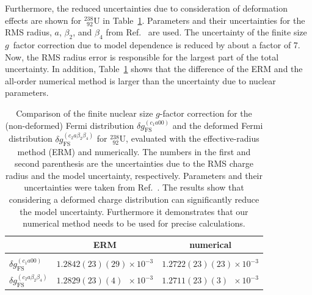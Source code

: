Furthermore, the reduced uncertainties due to consideration of deformation effects are shown for $^{238}_{\;\,92}$U in Table~\ref{tab:uranium}. Parameters and their uncertainties for the RMS radius, $a$, $\beta_2$, and $\beta_4$ from Ref.~\cite{kozhedub2008} are used. The uncertainty of the finite size $g$~factor correction due to model dependence is reduced by about a factor of 7. Now, the RMS radius error is responsible for the largest part of the total uncertainty.  
In addition, Table~\ref{tab:uranium} shows that the difference of the ERM and the all-order numerical method is larger than the uncertainty due to nuclear parameters.
%
\begin{table}[t]
\caption{\label{tab:uranium}%
Comparison of the finite nuclear size $g$-factor correction for the (non-deformed) Fermi distribution $\delta g_{\text{FS}}^{(c_1a00)}$ and the deformed Fermi distribution $\delta g^{(c_2 a \beta_2\beta_4)}_{\text{FS}}$ for $^{238}_{\;\,92}$U, evaluated with the effective-radius method (ERM) and numerically. The numbers in the first and second parenthesis are the uncertainties due to the RMS charge radius and the model uncertainty, respectively. Parameters and their uncertainties were taken from Ref.~\cite{jacek2012}. The results show that considering a deformed charge distribution can significantly reduce the model uncertainty. Furthermore it demonstrates that our numerical method needs to be used for precise calculations. 
}
\centering
\begin{tabular}{l|cc}
&ERM&numerical\\\hline\\
$\delta g_{\text{FS}}^{(c_1a00)}$&$1.2842(23)(29)\times 10^{-3}$&$1.2722(23)(23)\times 10^{-3}$\\[0.4cm]
$\delta g^{(c_2a\beta_2\beta_4)}_{\text{FS}}$&$1.2829(23)(4)\phantom{0}\times 10^{-3}$&$1.2711(23)(3)\phantom{0}\times 10^{-3}$
\end{tabular}
\end{table}
%
